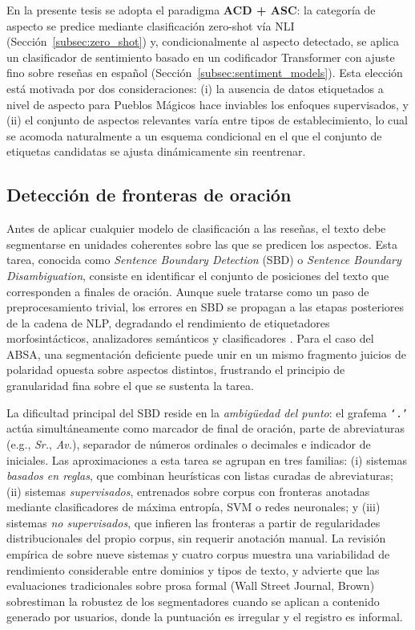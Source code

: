 En la presente tesis se adopta el paradigma \textbf{ACD + ASC}: la categoría de aspecto se predice mediante clasificación zero-shot vía NLI (Sección~\ref{subsec:zero_shot}) y, condicionalmente al aspecto detectado, se aplica un clasificador de sentimiento basado en un codificador Transformer con ajuste fino sobre reseñas en español (Sección~\ref{subsec:sentiment_models}). Esta elección está motivada por dos consideraciones: (i) la ausencia de datos etiquetados a nivel de aspecto para Pueblos Mágicos hace inviables los enfoques supervisados, y (ii) el conjunto de aspectos relevantes varía entre tipos de establecimiento, lo cual se acomoda naturalmente a un esquema condicional en el que el conjunto de etiquetas candidatas se ajusta dinámicamente sin reentrenar.


\subsection{Detección de fronteras de oración} \label{subsec:sbd}

Antes de aplicar cualquier modelo de clasificación a las reseñas, el texto debe segmentarse en unidades coherentes sobre las que se predicen los aspectos. Esta tarea, conocida como \textit{Sentence Boundary Detection} (SBD) o \textit{Sentence Boundary Disambiguation}, consiste en identificar el conjunto de posiciones del texto que corresponden a finales de oración. Aunque suele tratarse como un paso de preprocesamiento trivial, los errores en SBD se propagan a las etapas posteriores de la cadena de NLP, degradando el rendimiento de etiquetadores morfosintácticos, analizadores semánticos y clasificadores \citep{read_sentence_2012}. Para el caso del ABSA, una segmentación deficiente puede unir en un mismo fragmento juicios de polaridad opuesta sobre aspectos distintos, frustrando el principio de granularidad fina sobre el que se sustenta la tarea.

La dificultad principal del SBD reside en la \emph{ambigüedad del punto}: el grafema \texttt{`.'} actúa simultáneamente como marcador de final de oración, parte de abreviaturas (e.g., \textit{Sr.}, \textit{Av.}), separador de números ordinales o decimales e indicador de iniciales. Las aproximaciones a esta tarea se agrupan en tres familias: (i) sistemas \textit{basados en reglas}, que combinan heurísticas con listas curadas de abreviaturas; (ii) sistemas \textit{supervisados}, entrenados sobre corpus con fronteras anotadas mediante clasificadores de máxima entropía, SVM o redes neuronales; y (iii) sistemas \textit{no supervisados}, que infieren las fronteras a partir de regularidades distribucionales del propio corpus, sin requerir anotación manual. La revisión empírica de \citet{read_sentence_2012} sobre nueve sistemas y cuatro corpus muestra una variabilidad de rendimiento considerable entre dominios y tipos de texto, y advierte que las evaluaciones tradicionales sobre prosa formal (Wall Street Journal, Brown) sobrestiman la robustez de los segmentadores cuando se aplican a contenido generado por usuarios, donde la puntuación es irregular y el registro es informal.

